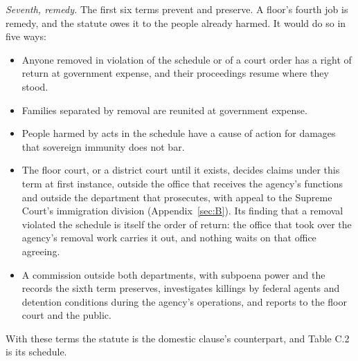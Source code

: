 \emph{Seventh, remedy.} The first six terms prevent and preserve. A floor's fourth job is remedy, and the statute owes it to the people already harmed. It would do so in five ways:

\begin{itemize}
\item Anyone removed in violation of the schedule or of a court order has a right of return at government expense, and their proceedings resume where they stood.
\item Families separated by removal are reunited at government expense.
\item People harmed by acts in the schedule have a cause of action for damages that sovereign immunity does not bar.
\item The floor court, or a district court until it exists, decides claims under this term at first instance, outside the office that receives the agency's functions and outside the department that prosecutes, with appeal to the Supreme Court's immigration division (Appendix~\ref{sec:B}). Its finding that a removal violated the schedule is itself the order of return: the office that took over the agency's removal work carries it out, and nothing waits on that office agreeing.
\item A commission outside both departments, with subpoena power and the records the sixth term preserves, investigates killings by federal agents and detention conditions during the agency's operations, and reports to the floor court and the public.
\end{itemize}

With these terms the statute is the domestic clause's counterpart, and Table C.2 is its schedule.
